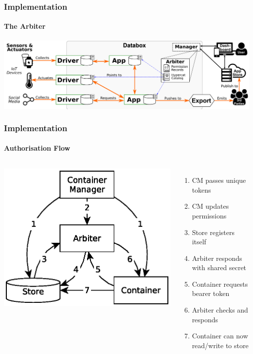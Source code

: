 \documentclass[aspectratio=169]{beamer}
\begin{document}
\begin{frame}
	\frametitle{Implementation}
	\framesubtitle{The Arbiter}
	\centering
	\includegraphics[width=\linewidth]{arch}
\end{frame}

\begin{frame}
	\frametitle{Implementation}
	\framesubtitle{Authorisation Flow}
	\begin{columns}[c]
		\centering
		\includegraphics[width=\textwidth]{auth-flow}
		\begin{enumerate}
			\pause
			\item CM passes unique tokens
			\pause
			\item CM updates permissions
			\pause
			\item Store registers itself
			\pause
			\item Arbiter responds with shared secret
			\pause
			\item Container requests bearer token
			\pause
			\item Arbiter checks and responds
			\pause
			\item Container can now read/write to store
		\end{enumerate}
	\end{columns}
\end{frame}
\end{document}
